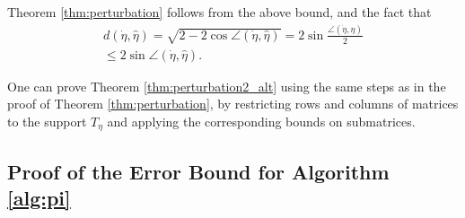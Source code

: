\documentclass[11pt,journal]{IEEEtran}
\begin{document}
\begin{IEEEproof}
Theorem \ref{thm:perturbation} follows from the above bound, and the fact that
\begin{align*}
d(\dot{\eta}, \hat{\eta}) = \sqrt{2 - 2 \cos\angle(\dot{\eta},\hat{\eta})} = 2\sin\frac{\angle(\dot{\eta}, \hat{\eta})}{2} \\
\leq 2\sin\angle(\dot{\eta}, \hat{\eta}).
\end{align*}
\end{IEEEproof}


One can prove Theorem \ref{thm:perturbation2_alt} using the same steps as in the proof of Theorem \ref{thm:perturbation}, by restricting rows and columns of matrices to the support $T_\eta$ and applying the corresponding bounds on submatrices.



\subsection{Proof of the Error Bound for Algorithm \ref{alg:pi}}
\end{document}
